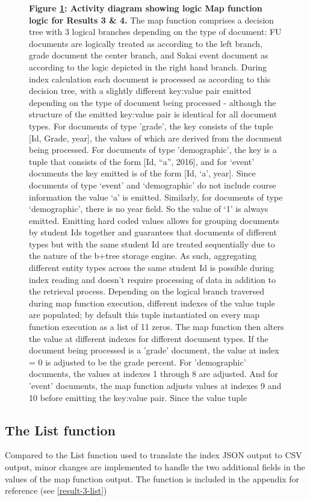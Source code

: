 \begin{figure}[ht]
    \caption[Result 1 Map function]{\textbf{Figure \ref{result-3-map-fn}: Activity diagram showing logic Map function logic for Results 3 \& 4.} The map function comprises a decision tree with 3 logical branches depending on the type of document: FU documents are logically treated as according to the left branch, grade document the center branch, and Sakai event document as according to the logic depicted in the right hand branch. During index calculation each document is processed as according to this decision tree, with a slightly different key:value pair emitted depending on the type of document being processed - although the structure of the emitted key:value pair is identical for all document types. For documents of type 'grade', the key consists of the tuple [Id, Grade, year], the values of which are derived from the document being processed. For documents of type 'demographic', the key is a tuple that consists of the form [Id, ``a'', 2016], and for `event' documents the key emitted is of the form [Id, `a', year]. Since documents of type `event' and `demographic' do not include course information the value `a' is emitted. Similarly, for documents of type `demographic', there is no year field. So the value of `1' is always emitted. Emitting hard coded values allows for grouping documents by student Ids together and guarantees that documents of different types but with the same student Id are treated sequentially due to the nature of the b+tree storage engine. As such, aggregating different entity types across the same student Id is possible during index reading and doesn't require processing of data in addition to the retrieval process. Depending on the logical branch traversed during map function execution, different indexes of the value tuple are populated; by default this tuple instantiated on every map function execution as a list of 11 zeros. The map function then alters the value at different indexes for different document types. If the document being processed is a 'grade' document, the value at index = 0 is adjusted to be the grade percent. For 'demographic' documents, the values at indexes 1 through 8 are adjusted. And for 'event' documents, the map function adjusts values at indexes 9 and 10 before emitting the key:value pair. Since the value tuple }
    \label{result-3-map-fn}
\end{figure}

\subsection*{The List function}
Compared to the List function used to translate the index JSON output to CSV output, minor changes are implemented to handle the two additional fields in the values of the map function output. The function is included in the appendix for reference (see \ref{result-3-list})